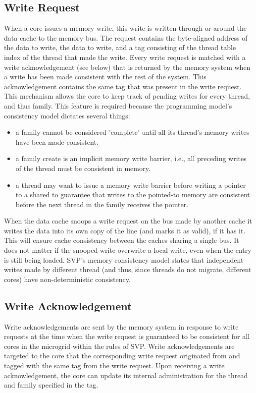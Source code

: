 \subsection{Write Request}
When a core issues a memory write, this write is written through or around the data cache to the memory bus. The request contains the byte-aligned address of the data to write, the data to write, and a tag consisting of the thread table index of the thread that made the write. Every write request is matched with a write acknowledgement (see below) that is returned by the memory system when a write has been made consistent with the rest of the system. This acknowledgement contains the same tag that was present in the write request. This mechanism allows the core to keep track of pending writes for every thread, and thus family. This feature is required because the programming model's consistency model dictates several things:
\begin{itemize}
\item a family cannot be considered 'complete' until all its thread's memory writes have been made consistent.
\item a family create is an implicit memory write barrier, i.e., all preceding writes of the thread must be consistent in memory.
\item a thread may want to issue a memory write barrier before writing a pointer to a shared to guarantee that writes to the pointed-to memory are consistent before the next thread in the family receives the pointer.
\end{itemize}

When the data cache snoops a write request on the bus made by another cache it writes the data into its own copy of the line (and marks it as valid), if it has it. This will ensure cache consistency between the caches sharing a single bus. It does not matter if the snooped write overwrite a local write, even when the entry is still being loaded. SVP's memory consistency model states that independent writes made by different thread (and thus, since threads do not migrate, different cores) have non-deterministic consistency.

\subsection{Write Acknowledgement}
Write acknowledgements are sent by the memory system in response to write requests at the time when the write request is guaranteed to be consistent for all cores in the microgrid within the rules of SVP. Write acknowledgements are targeted to the core that the corresponding write request originated from and tagged with the same tag from the write request. Upon receiving a write acknowledgement, the core can update its internal administration for the thread and family specified in the tag.

